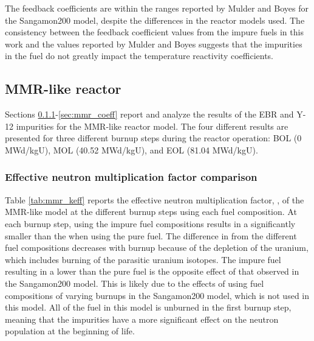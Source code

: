 The feedback coefficients are within the ranges reported 
by Mulder and Boyes \cite{mulder_neutronics_2020} for the 
Sangamon200 model, despite the differences 
in the reactor models used.
The consistency between the feedback coefficient values from the impure 
fuels in this work and the values reported by Mulder and Boyes 
\cite{mulder_neutronics_2020} suggests that 
the impurities in the fuel do not greatly impact the temperature reactivity 
coefficients.

\subsection{MMR-like reactor}
Sections \ref{sec:mmr_keff}-\ref{sec:mmr_coeff} report and analyze 
the results of the 
\gls*{EBR} and Y-12 impurities for the \gls*{MMR}-like reactor model. 
The four different results are presented for three different 
burnup steps during the reactor operation: \gls*{BOL} (0 MWd/kgU),
\gls*{MOL} (40.52 MWd/kgU), and \gls*{EOL} (81.04 MWd/kgU). 

\subsubsection{Effective neutron multiplication factor comparison}\label{sec:mmr_keff}
Table \ref{tab:mmr_keff} reports the effective 
neutron multiplication factor, \keff, of the \gls*{MMR}-like 
model at the 
different burnup steps using each fuel composition. At each burnup step, 
using the impure fuel compositions results in a \keff significantly 
smaller than the \keff when using the pure fuel. The difference in \keff 
from the different fuel compositions decreases with burnup because of 
the depletion of the uranium, which includes burning of the parasitic 
uranium isotopes. The impure fuel resulting in a lower \keff 
than the pure fuel is the opposite 
effect of that observed in the Sangamon200 model. This is likely due to 
the effects of using fuel compositions of varying burnups in the 
Sangamon200 model, which is not used in this model. All of the fuel in this 
model is unburned in the 
first burnup step, meaning that the impurities have a more significant 
effect on the neutron population at the beginning of life. 

